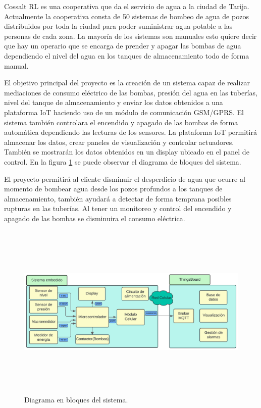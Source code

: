\documentclass[
11pt, %
codirector, %
]{charter}
\begin{document}
Cossalt RL es una cooperativa que da el servicio de agua a la ciudad de Tarija. Actualmente la cooperativa consta de 50 sistemas de bombeo de agua de pozos distribuidos por toda la ciudad para poder suministrar agua potable a las personas de cada zona. La mayoría de los sistemas son manuales esto quiere decir que hay un operario que se encarga de prender y apagar las bombas de agua dependiendo el nivel del agua en los tanques de almacenamiento todo de forma manual.

El objetivo principal del proyecto es la creación de un sistema capaz de realizar mediaciones de consumo eléctrico de las bombas, presión del agua en las tuberías, nivel del tanque de almacenamiento y enviar los datos obtenidos a una plataforma IoT haciendo uso de un módulo de comunicación GSM/GPRS. El sistema también controlara el encendido y apagado de las bombas de forma automática dependiendo las lecturas de los sensores. La plataforma IoT permitirá almacenar los datos, crear paneles de visualización y controlar actuadores. También se mostrarán los datos obtenidos en un display ubicado en el panel de control.
En la figura \ref{fig:diagra_sistema} se puede observar el diagrama de bloques del sistema.

El proyecto permitirá al cliente disminuir el desperdicio de agua que ocurre al momento de bombear agua desde los pozos profundos a los tanques de almacenamiento, también ayudará a detectar de forma temprana posibles rupturas en las tuberías. Al tener un monitoreo y control del encendido y apagado de las bombas se disminuira el consumo eléctrica.

\begin{figure}[hpb]
	\centering 
	\includegraphics[width=15cm, height=8.5cm]{./Figuras/d_sistema.png}
	\caption{Diagrama en bloques del sistema.}
	\label{fig:diagra_sistema}
\end{figure}
\vspace{2cm}
\end{document}
